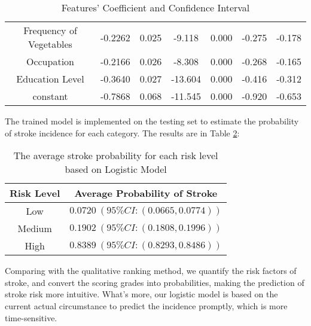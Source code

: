 \documentclass{article}
\begin{document}
\begin{table}[H]
\begin{tabular}{ccccccc}
Frequency of Vegetables  & -0.2262 & 0.025 & -9.118  & 0.000 & -0.275 & -0.178 \\
Occupation               & -0.2166 & 0.026 & -8.308  & 0.000 & -0.268 & -0.165 \\
Education Level          & -0.3640 & 0.027 & -13.604 & 0.000 & -0.416 & -0.312 \\
constant                 & -0.7868 & 0.068 & -11.545 & 0.000 & -0.920 & -0.653 \\ \hline
\end{tabular}
\caption{Features' Coefficient and Confidence Interval}
\label{table:logistic-factor}
\end{table}


 The trained model is implemented on the testing set  to estimate the probability of stroke incidence for each category. The results are in Table \ref{table:average_stroke_probability}:

\begin{table}[H]
\small
\centering
\begin{tabular}{cc}
\hline
\textbf{Risk   Level} & \textbf{Average Probability of Stroke} \\ \hline
Low                   & $0.0720 \ (95\% CI: (0.0665, 0.0774))$                                \\ 
Medium                & $0.1902 \ (95\% CI: (0.1808, 0.1996))$                                \\ 
High                  & $0.8389 \ (95\% CI: (0.8293, 0.8486))$                                \\ \hline
\end{tabular}
\caption{The average stroke probability for each risk level based on Logistic Model}
\label{table:average_stroke_probability}
\end{table}

Comparing with the  qualitative  ranking method, we quantify the risk factors of stroke, and convert the scoring grades into probabilities, making the prediction of stroke risk more intuitive. What's more,  our logistic model is based on the current actual circumstance to predict the incidence promptly, which is more time-sensitive. 
\end{document}

